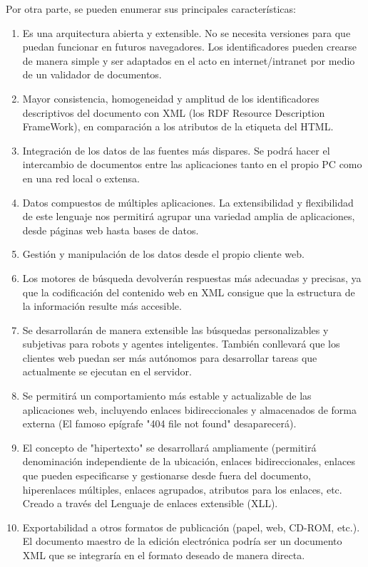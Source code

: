 Por otra parte, se pueden enumerar sus principales características:
\begin{enumerate}[1.]
\item Es una arquitectura abierta y extensible. No se necesita versiones para que puedan funcionar en futuros navegadores. Los identificadores pueden crearse de manera simple y ser adaptados en el acto en internet/intranet por medio de un validador de documentos.
\item Mayor consistencia, homogeneidad y amplitud de los identificadores descriptivos del documento con XML (los RDF Resource Description FrameWork), en comparación a los atributos de la etiqueta del HTML. 
\item Integración de los datos de las fuentes más dispares. Se podrá hacer el intercambio de documentos entre las aplicaciones tanto en el propio PC como en una red local o extensa.
\item Datos compuestos de múltiples aplicaciones. La extensibilidad y flexibilidad de este lenguaje nos permitirá agrupar una variedad amplia de aplicaciones, desde páginas web hasta bases de datos.
\item Gestión y manipulación de los datos desde el propio cliente web. 
\item Los motores de búsqueda devolverán respuestas más adecuadas y precisas, ya que la codificación del contenido web en XML consigue que la estructura de la información resulte más accesible. 
\item Se desarrollarán de manera extensible las búsquedas personalizables y subjetivas para robots y agentes inteligentes. También conllevará que los clientes web puedan ser más autónomos para desarrollar tareas que actualmente se ejecutan en el servidor.
\item Se permitirá un comportamiento más estable y actualizable de las aplicaciones web, incluyendo enlaces bidireccionales y almacenados de forma externa (El famoso epígrafe "404 file not found" desaparecerá).
\item El concepto de "hipertexto" se desarrollará ampliamente (permitirá denominación independiente de la ubicación, enlaces bidireccionales, enlaces que pueden especificarse y gestionarse desde fuera del documento, hiperenlaces múltiples, enlaces agrupados, atributos para los enlaces, etc. Creado a través del Lenguaje de enlaces extensible (XLL).
\item Exportabilidad a otros formatos de publicación (papel, web, CD-ROM, etc.). El documento maestro de la edición electrónica podría ser un documento XML que se integraría en el formato deseado de manera directa.
\end{enumerate}

